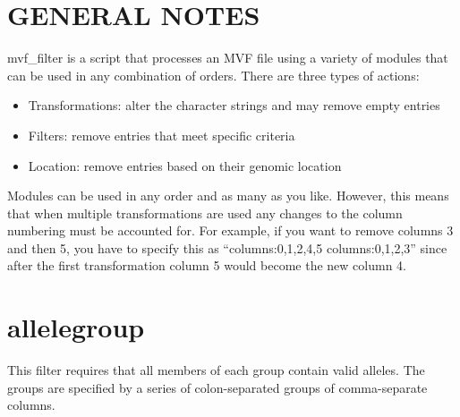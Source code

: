 \documentclass[letterpaper,11pt,english]{sphinxmanual}
\begin{document}
\section{GENERAL NOTES}
\label{\detokenize{mvf_filter_modules:general-notes}}
mvf\_filter is a script that processes an MVF file using a variety
of modules that can be used in any combination of orders.  There
are three types of actions:
\begin{itemize}
\item {} 
Transformations: alter the character strings and may remove empty entries

\item {} 
Filters: remove entries that meet specific criteria

\item {} 
Location: remove entries based on their genomic location

\end{itemize}

Modules can be used in any order and as many as you like.  However,
this means that when multiple transformations are used any changes
to the column numbering must be accounted for.  For example,
if you want to remove columns 3 and then 5, you have to specify this as
“columns:0,1,2,4,5 columns:0,1,2,3” since after the first
transformation column 5 would become the new column 4.


\section{allelegroup}
\label{\detokenize{mvf_filter_modules:allelegroup}}
This filter requires that all members of each group contain
valid alleles.  The groups are specified by a series of colon-separated
groups of comma-separate columns.

\begin{sphinxVerbatim}[commandchars=\\\{\}]
  
 
 
 
\end{sphinxVerbatim}
\end{document}
